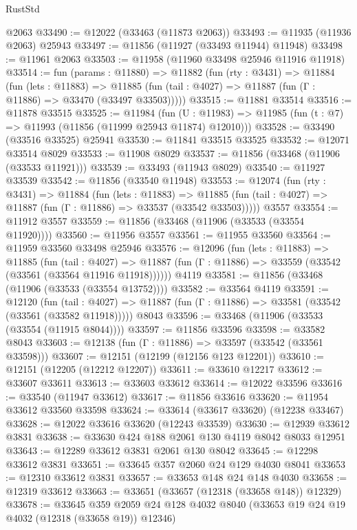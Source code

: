 \begin{lexlean}{RustStd}
\begin{coremodule}
    @2063
@33490 := @12022 (@33463 (@11873 @2063))
@33493 := @11935 (@11936 @2063) @25943
@33497 := @11856 (@11927 (@33493 @11944) @11948)
@33498 := @11961 @2063
@33503 := @11958 (@11960 @33498 @25946 @11916 @11918)
@33514 := fun (params : @11880) =>
  @11882
    (fun (rty : @3431) =>
    @11884
      (fun (lets : @11883) =>
      @11885 (fun (tail : @4027) => @11887 (fun (Γ : @11886) => @33470 (@33497 @33503)))))
@33515 := @11881 @33514
@33516 := @11878 @33515
@33525 := @11984
    (fun (U : @11983) => @11985 (fun (t : @7) => @11993 (@11856 (@11999 @25943 @11874) @12010)))
@33528 := @33490 (@33516 @33525) @25941
@33530 := @11841 @33515 @33525
@33532 := @12071 @33514 @8029
@33533 := @11908 @8029
@33537 := @11856 (@33468 (@11906 (@33533 @11921)))
@33539 := @33493 (@11943 @8029)
@33540 := @11927 @33539
@33542 := @11856 (@33540 @11948)
@33553 := @12074
    (fun (rty : @3431) =>
    @11884
      (fun (lets : @11883) =>
      @11885 (fun (tail : @4027) => @11887 (fun (Γ : @11886) => @33537 (@33542 @33503)))))
    @3557
@33554 := @11912 @3557
@33559 := @11856 (@33468 (@11906 (@33533 (@33554 @11920))))
@33560 := @11956 @3557
@33561 := @11955 @33560
@33564 := @11959 @33560 @33498 @25946
@33576 := @12096
    (fun (lets : @11883) =>
    @11885
      (fun (tail : @4027) =>
      @11887 (fun (Γ : @11886) => @33559 (@33542 (@33561 (@33564 @11916 @11918))))))
    @4119
@33581 := @11856 (@33468 (@11906 (@33533 (@33554 @13752))))
@33582 := @33564 @4119
@33591 := @12120
    (fun (tail : @4027) => @11887 (fun (Γ : @11886) => @33581 (@33542 (@33561 (@33582 @11918)))))
    @8043
@33596 := @33468 (@11906 (@33533 (@33554 (@11915 @8044))))
@33597 := @11856 @33596
@33598 := @33582 @8043
@33603 := @12138 (fun (Γ : @11886) => @33597 (@33542 (@33561 @33598)))
@33607 := @12151 (@12199 (@12156 @123 @12201))
@33610 := @12151 (@12205 (@12212 @12207))
@33611 := @33610 @12217
@33612 := @33607 @33611
@33613 := @33603 @33612
@33614 := @12022 @33596
@33616 := @33540 (@11947 @33612)
@33617 := @11856 @33616
@33620 := @11954 @33612 @33560 @33598
@33624 := @33614 (@33617 @33620) (@12238 @33467)
@33628 := @12022 @33616 @33620 (@12243 @33539)
@33630 := @12939 @33612 @3831
@33638 := @33630 @424 @188 @2061 @130 @4119 @8042 @8033 @12951
@33643 := @12289 @33612 @3831 @2061 @130 @8042
@33645 := @12298 @33612 @3831
@33651 := @33645 @357 @2060 @24 @129 @4030 @8041
@33653 := @12310 @33612 @3831
@33657 := @33653 @148 @24 @148 @4030
@33658 := @12319 @33612
@33663 := @33651 (@33657 (@12318 (@33658 @148)) @12329)
@33678 := @33645
    @359
    @2059
    @24
    @128
    @4032
    @8040
    (@33653 @19 @24 @19 @4032 (@12318 (@33658 @19)) @12346)

\end{coremodule}
\end{lexlean}

